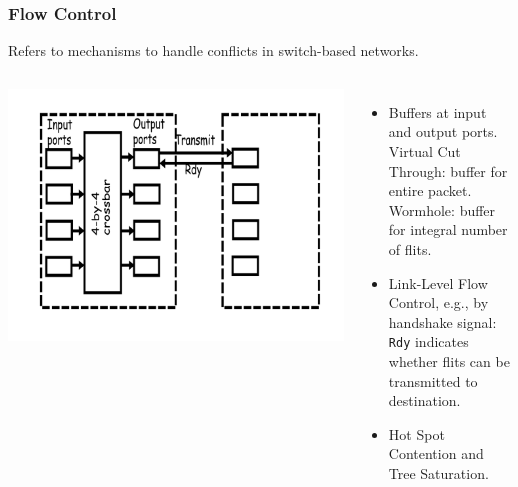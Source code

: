 \documentclass{beamer}
\newcommand{\emp}[1]{\textcolor{DikuRed}{ #1}}
\begin{document}
\begin{frame}[fragile,t]
\frametitle{Flow Control}

Refers to mechanisms to handle conflicts in switch-based networks.

\begin{columns}
\includegraphics[width=50ex]{FigsInterconnect/Conflicts1}
\vspace{-1ex}
\begin{itemize}
    \item Buffers at input and output ports.\\
          Virtual Cut Through: buffer for entire packet.\\
          Wormhole: buffer for integral number of {\sc flit}s.\medskip
    \item \emp{Link-Level Flow Control}, e.g., by handshake signal:\\
            {\tt Rdy} indicates whether {\sc flit}s can be transmitted to destination. 
    \item Hot Spot Contention and Tree Saturation. 
\end  {itemize}
\end{columns}

\end{frame}
\end{document}
